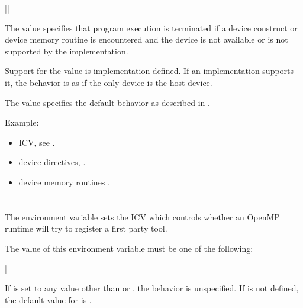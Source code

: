{||}

The  value specifies that program execution is terminated if a device construct or device memory routine is encountered and the 
device is not available or is not supported by the implementation.

Support for the  value is implementation defined.  If an implementation supports it, the behavior is as if 
the only device is the host device.

The  value specifies the default behavior as described in .

Example:
\begin{ompEnv}
\end{ompEnv}

\crossreferences
\begin{itemize}
\item {} ICV, see .
\item device directives, .
\item device memory routines .
\end{itemize}




\section{}
\label{sec:OMP_TOOL}

The  environment variable sets the  ICV which controls whether an OpenMP runtime will try to register a
first party tool.

The value of this environment variable must be one of the following:

{|}

If  is set to any value other than  or , the behavior is unspecified.
If  is not defined, the default value for  is .


